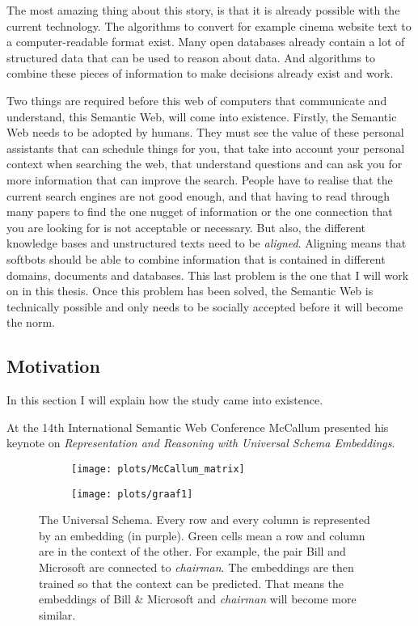 \documentclass{article}
\begin{document}
 The most amazing thing about this story, is that it is already possible with the current technology. The algorithms to convert for example cinema website text to a computer-readable format exist. Many open databases already contain a lot of structured data that can be used to reason about data. And algorithms to combine these pieces of information to make decisions already exist and work.
 
 Two things are required before this web of computers that communicate and understand, this Semantic Web, will come into existence. 
 Firstly, the Semantic Web needs to be adopted by humans. They must see the value of these personal assistants that can schedule things for you, that take into account your personal context when searching the web, that understand questions and can ask you for more information that can improve the search. People have to realise that the current search engines are not good enough, and that having to read through many papers to find the one nugget of information or the one connection that you are looking for is not acceptable or necessary.
 But also, the different knowledge bases and unstructured texts need to be \emph{aligned}. Aligning means that softbots should be able to combine information that is contained in different domains, documents and databases. This last problem is the one that I will work on in this thesis. Once this problem has been solved, the Semantic Web is technically possible and only needs to be socially accepted before it will become the norm.

 \subsection{Motivation}
 In this section I will explain how the study came into existence.
 
 At the 14th International Semantic Web Conference McCallum presented his keynote on \emph{Representation and Reasoning with Universal Schema Embeddings}\cite{mccallumweblecture}. 
 
 \begin{figure}[H]
 \begin{subfigure}{.475\textwidth}
 \texttt{[image: plots/McCallum\_matrix]}
 \end{subfigure}
 \begin{subfigure}{0.475\textwidth}
 \texttt{[image: plots/graaf1]}
 \end{subfigure}
 \caption{The Universal Schema. Every row and every column is represented by an embedding (in purple). Green cells mean a row and column are in the context of the other. For example, the pair Bill and Microsoft are connected to \emph{chairman}.
 The embeddings are then trained so that the context can be predicted. That means the embeddings of Bill \& Microsoft and \emph{chairman} will become more similar.}
 \label{McCallum_matrix}
 \end{figure}
\end{document}
